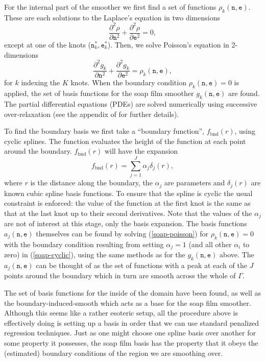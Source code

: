 For the internal part of the smoother we first find a set of functions $\rho_k(\texttt{n},\texttt{e})$. These are each solutions to the Laplace's equation in two dimensions
$$
\frac{\partial^2\rho}{\partial \texttt{n}^2} + \frac{\partial^2\rho}{\partial \texttt{e}^2} = 0,
$$
except at one of the knots ($\texttt{n}^*_k,\texttt{e}^*_k$). Then, we solve Poisson's equation in 2-dimensions
\begin{equation}
\frac{\partial^2 g_k}{\partial \texttt{n}^2} + \frac{\partial^2 g_k}{\partial \texttt{e}^2} = \rho_k(\texttt{n},\texttt{e}),
\label{soap-poisson}
\end{equation}
for $k$ indexing the $K$ knots. When the boundary condition $\rho_k(\texttt{n},\texttt{e})=0$ is applied, the set of basis functions for the soap film smoother $g_k(\texttt{n},\texttt{e})$ are found.  The partial differential equations (PDEs) are solved numerically using successive over-relaxation (see the appendix of \cite{soap} for further details).

To find the boundary basis we first take a ``boundary function'', $f_\text{bnd}(r)$, using cyclic splines. The function evaluates the height of the function at each point around the boundary. $f_\text{bnd}(r)$ will have the expansion
\begin{equation}
f_\text{bnd}(r)=\sum_{j=1}^J \alpha_j \delta_j(r),
\label{soap-cyclic}
\end{equation}
where $r$ is the distance along the boundary, the $\alpha_j$ are parameters and $\delta_j(r)$ are known cubic spline basis functions. To ensure that the spline is cyclic the usual constraint is enforced: the value of the function at the first knot is the same as that at the last knot up to their second derivatives. Note that  the values of the $\alpha_j$ are not of interest at this stage, only the basis expansion. The basis functions $a_j(\texttt{n},\texttt{e})$ themselves can be found by solving (\ref{soap-poisson}) for $\rho_k(\texttt{n},\texttt{e})= 0$ with the boundary condition resulting from setting $\alpha_j=1$ (and all other $\alpha_i$ to zero) in (\ref{soap-cyclic}), using the same methods as for the $g_k(\texttt{n},\texttt{e})$ above. The $a_j(\texttt{n},\texttt{e})$ can be thought of as the set of functions with a peak at each of the $J$ points around the boundary which in turn are smooth across the whole of $\Gamma$.

The set of basis functions for the inside of the domain have been found, as well as the boundary-induced-smooth which acts as a base for the soap film smoother. Although this seems like a rather esoteric setup, all the procedure above is effectively doing is setting up a basis in order that we can use standard penalized regression techniques. Just as one might choose one spline basis over another for some property it possesses, the soap film basis has the property that it obeys the (estimated) boundary conditions of the region we are smoothing over.

